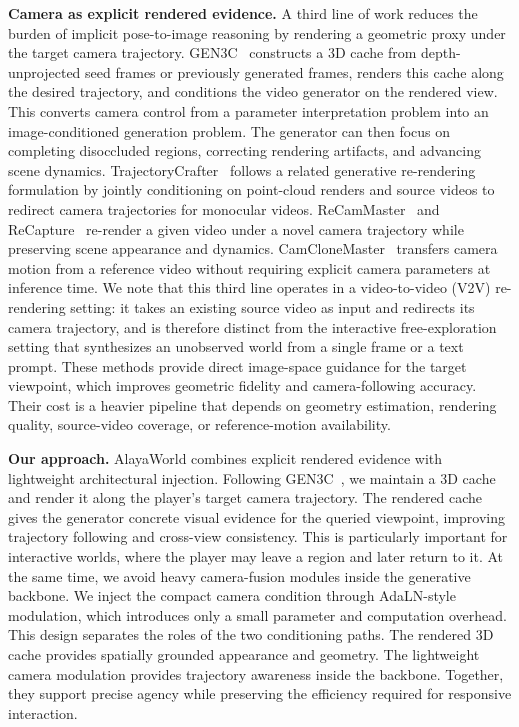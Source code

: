 \textbf{Camera as explicit rendered evidence.}
A third line of work reduces the burden of implicit pose-to-image reasoning by rendering a geometric proxy under the target camera trajectory.
GEN3C~\cite{ren2025gen3c} constructs a 3D cache from depth-unprojected seed frames or previously generated frames, renders this cache along the desired trajectory, and conditions the video generator on the rendered view.
This converts camera control from a parameter interpretation problem into an image-conditioned generation problem.
The generator can then focus on completing disoccluded regions, correcting rendering artifacts, and advancing scene dynamics.
TrajectoryCrafter~\cite{yu2025trajectorycrafter} follows a related generative re-rendering formulation by jointly conditioning on point-cloud renders and source videos to redirect camera trajectories for monocular videos.
ReCamMaster~\cite{bai2025recammaster} and ReCapture~\cite{zhang2024recapture} re-render a given video under a novel camera trajectory while preserving scene appearance and dynamics.
CamCloneMaster~\cite{luo2025camclonemaster} transfers camera motion from a reference video without requiring explicit camera parameters at inference time.
We note that this third line operates in a video-to-video (V2V) re-rendering setting: it takes an existing source video as input and redirects its camera trajectory, and is therefore distinct from the interactive free-exploration setting that synthesizes an unobserved world from a single frame or a text prompt.
These methods provide direct image-space guidance for the target viewpoint, which improves geometric fidelity and camera-following accuracy.
Their cost is a heavier pipeline that depends on geometry estimation, rendering quality, source-video coverage, or reference-motion availability.

\textbf{Our approach.}
AlayaWorld combines explicit rendered evidence with lightweight architectural injection.
Following GEN3C~\cite{ren2025gen3c}, we maintain a 3D cache and render it along the player's target camera trajectory.
The rendered cache gives the generator concrete visual evidence for the queried viewpoint, improving trajectory following and cross-view consistency.
This is particularly important for interactive worlds, where the player may leave a region and later return to it.
At the same time, we avoid heavy camera-fusion modules inside the generative backbone.
We inject the compact camera condition through AdaLN-style modulation, which introduces only a small parameter and computation overhead.
This design separates the roles of the two conditioning paths.
The rendered 3D cache provides spatially grounded appearance and geometry.
The lightweight camera modulation provides trajectory awareness inside the backbone.
Together, they support precise agency while preserving the efficiency required for responsive interaction.

